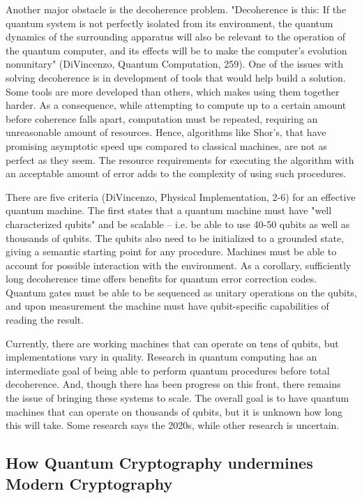 \documentclass[11pt]{article}
\begin{document}
Another major obstacle is the decoherence problem. "Decoherence is this: If the quantum system is not perfectly isolated from its environment, the quantum dynamics of the surrounding apparatus will also be relevant to the operation
of the quantum computer, and its effects will be to make the computer's evolution nonunitary" (DiVincenzo, Quantum Computation, 259).
One of the issues with solving decoherence is in development of tools that would help build a solution. Some tools are more developed than others, which makes using them together harder.
As a consequence, while attempting to compute up to a certain amount
before coherence falls apart, computation must be repeated, requiring an unreasonable amount of resources. Hence, algorithms like Shor's, that have promising asymptotic speed
ups compared to classical machines, are not as perfect as they seem.
The resource requirements for executing the algorithm with an acceptable amount of
error adds to the complexity of using such procedures.

There are five criteria (DiVincenzo, Physical Implementation, 2-6) for an effective quantum machine. The first states
that a quantum machine must have "well characterized qubits" and be scalable -- i.e.
be able to use 40-50 qubits as well as thousands of qubits. The qubits also need to be initialized to a grounded state, giving a semantic starting point for any procedure.
Machines must be able to account for possible interaction with the environment.
As a corollary, sufficiently long decoherence time offers benefits for quantum error correction codes.
Quantum gates must be able to be sequenced as unitary operations on the qubits, and
upon measurement the machine must have qubit-specific capabilities of reading the result. 

Currently, there are working machines that can operate on tens of qubits, but implementations vary in quality. Research in quantum computing has an intermediate goal of being able to perform quantum procedures before total decoherence. And, though there has been progress on this front, there remains the issue of bringing these systems to scale.
The overall goal is to have quantum machines that can operate on thousands of qubits, but it is unknown how long this will take. Some research says the 2020s, while other research is uncertain. 


\subsection{How Quantum Cryptography undermines Modern Cryptography} 
\end{document}
